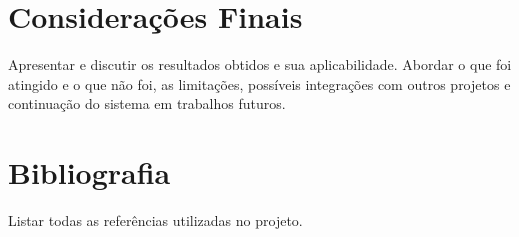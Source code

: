 \documentclass[a4paper,12pt]{article}
\begin{document}
\newpage
\section{Considerações Finais}
Apresentar e discutir os resultados obtidos e sua aplicabilidade. Abordar o que foi atingido e o que não foi, as limitações, possíveis integrações com outros projetos e continuação do sistema em trabalhos futuros.

\newpage
\section{Bibliografia}

Listar todas as referências utilizadas no projeto.
\end{document}
